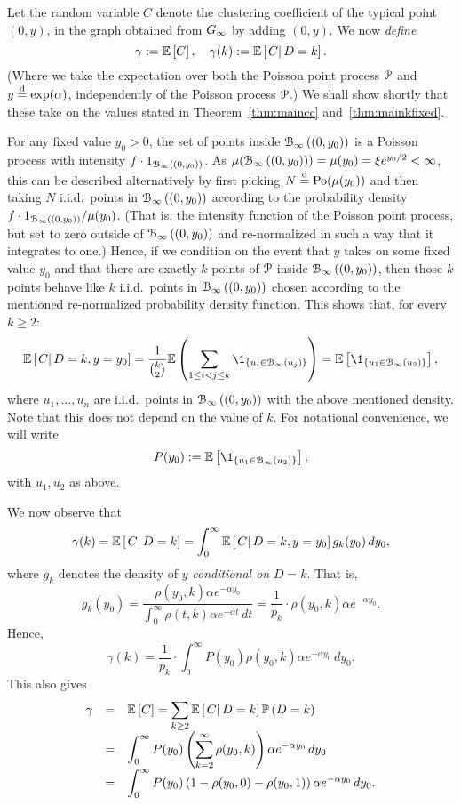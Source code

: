 Let the random variable $C$ denote the clustering coefficient of the typical point $(0,y)$, in the graph obtained from $G_{\infty}$ by adding $(0,y)$. We now {\em define}
\[
	\gamma := \mathbb{E}\left[C\right], \quad \gamma(k) := \mathbb{E}\left[\left.C\right|D = k\right].
\]
(Where we take the expectation over both the Poisson point process ${\mathcal P}$ and $y \stackrel{\text{d}}{=} \text{exp}(\alpha)$, independently of the Poisson process ${\mathcal P}$.) We shall show shortly that these take on the values stated in Theorem~\ref{thm:maincc} and~\ref{thm:mainkfixed}.


For any fixed value $y_0>0$, the set of points inside ${\mathcal B}_{\infty}\left((0,y_0)\right)$ is a Poisson process with intensity $f \cdot 1_{{\mathcal B}_{\infty}\left((0,y_0)\right)}$. As $\mu({\mathcal B}_{\infty}\left((0,y_0)\right)) = \mu(y_0) = \xi e^{y_0/2} < \infty$, this can be described alternatively by first picking $N \stackrel{\text{d}}{=} {\mathrm{Po}}( \mu(y_0) )$ and then taking $N$ i.i.d.~points in ${\mathcal B}_{\infty}\left((0,y_0)\right)$ according to the probability density $f \cdot 1_{{\mathcal B}_{\infty}\left((0,y_0)\right)} / \mu(y_0)$. (That is, the intensity function of the Poisson point process, but set to zero outside of ${\mathcal B}_{\infty}\left((0,y_0)\right)$ and re-normalized in such a way that it integrates to one.) Hence, if we condition on the event that $y$ takes on some fixed value $y_0$ and that there are exactly $k$ points of ${\mathcal P}$ inside ${\mathcal B}_{\infty}\left((0,y_0)\right)$, then those $k$ points behave like $k$ i.i.d.~points in ${\mathcal B}_{\infty}\left((0,y_0)\right)$ chosen according to the mentioned re-normalized probability density function. This shows that, for every $k\geq 2$:
\[
	\CExp{C}{D=k, y=y_0} 
	= \frac{1}{{k\choose 2}} \Ee\left( \sum_{1\leq i < j \leq k} \1_{\{u_i\in \BallPo{u_j}\}} \right)
	= \Exp{\1_{\{u_1\in\BallPo{u_2}\}}},
\]
where $u_1,\dots, u_n$ are i.i.d.~points in ${\mathcal B}_{\infty}\left((0,y_0)\right)$ with the above mentioned density.
Note that this does not depend on the value of $k$. For notational convenience, we will write 
\[ 
	P(y_0) := \Exp{\1_{\{u_1\in\BallPo{u_2}\}}},
\]
with $u_1, u_2$ as above.

We now observe that 
\[
	\gamma(k) = \mathbb{E}\left[\left.C\right|D=k\right] = \int_0^\infty \mathbb{E}\left[\left.C\right|D=k, y=y_0\right] g_k(y_0) \, d y_0,
\]
where $g_k$ denotes the density of $y$ {\em conditional on} $D=k$. That is,
\[
	g_k(y_0)  = \frac{\rho(y_0, k) \alpha e^{-\alpha y_0} }{\int_0^\infty \rho(t, k) \alpha e^{-\alpha t} \, d t}
	= \frac{1}{p_k} \cdot \rho(y_0, k) \alpha e^{-\alpha y_0}.
\]
Hence, 
\begin{equation}\label{eq:gammakint}
\gamma(k) 
= \frac{1}{p_k} \cdot \int_0^\infty P(y_0) \rho(y_0,k) \alpha e^{-\alpha y_0} \, d y_0. 
\end{equation}
This also gives
\begin{equation}\label{eq:gammaint}
\begin{array}{rcl} 
\gamma 
& = & \displaystyle \mathbb{E}\left[C\right] = \sum_{k\geq 2} \mathbb{E}\left[\left. C \right| D=k \right]\mathbb{P}\left( D=k \right) \\
& = & \displaystyle \int_0^\infty P(y_0) \left( \sum_{k=2}^\infty \rho(y_0,k) \right) \alpha e^{-\alpha y_0} \, d y_0 \\
& = & \displaystyle \int_0^\infty P(y_0) \left(1 - \rho(y_0,0)-\rho(y_0,1)\right) \alpha e^{-\alpha y_0} \, d y_0.
\end{array}
\end{equation}


